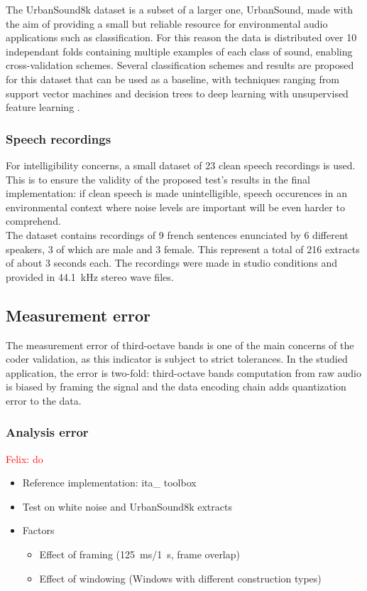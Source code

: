 \documentclass[12pt,times,onecolumn]{article}
\newcommand{\fg}[1]{\textcolor{red}{ Felix: #1}}
\begin{document}
The UrbanSound8k dataset is a subset of a larger one, UrbanSound, made with the aim of providing a small but reliable resource for environmental audio applications such as classification. For this reason the data is distributed over 10 independant folds containing multiple examples of each class of sound, enabling cross-validation schemes. Several classification schemes and results are proposed for this dataset that can be used as a baseline, with techniques ranging from support vector machines and decision trees \cite{salamon2014} to deep learning \cite{salamon2017} with unsupervised feature learning \cite{salamon2015-2}.

\subsubsection{Speech recordings}
For intelligibility concerns, a small dataset of 23 clean speech recordings is used. This is to ensure the validity of the proposed test's results in the final implementation: if clean speech is made unintelligible, speech occurences in an environmental context where noise levels are important will be even harder to comprehend.\\

The dataset contains recordings of 9 french sentences enunciated by 6 different speakers, 3 of which are male and 3 female. This represent a total of 216 extracts of about 3 seconds each. The recordings were made in studio conditions and provided in 44.1~kHz stereo wave files.


\subsection{Measurement error}
The measurement error of third-octave bands is one of the main concerns of the coder validation, as this indicator is subject to strict tolerances. In the studied application, the error is two-fold: third-octave bands computation from raw audio is biased by framing the signal and the data encoding chain adds quantization error to the data.
\subsubsection{Analysis error}
\fg{do}
\begin{itemize}
\item Reference implementation: ita\_ toolbox
\item Test on white noise and UrbanSound8k extracts
\item Factors
\begin{itemize}
\item Effect of framing (125~ms/1~s, frame overlap)
\item Effect of windowing (Windows with different construction types)
\end{itemize}
\end{itemize}
\end{document}
